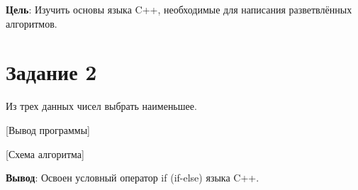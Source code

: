 \documentclass{bsuir}
\begin{document}

\textbf{Цель}: Изучить основы языка C++, необходимые для написания разветвлённых
алгоритмов.

\section*{Задание 2}

Из трех данных чисел выбрать наименьшее.


[Вывод программы]

[Схема алгоритма]

\textbf{Вывод}: Освоен условный оператор if (if-else) языка C++.
\end{document}
